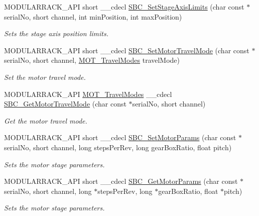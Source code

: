 \begin{DoxyCompactItemize}
M\+O\+D\+U\+L\+A\+R\+R\+A\+C\+K\+\_\+\+A\+PI short \+\_\+\+\_\+cdecl \hyperlink{group___modular_stepper_ga25ab4d2f78be5021d04e5cf0fda41ac2}{S\+B\+C\+\_\+\+Set\+Stage\+Axis\+Limits} (char const $\ast$serial\+No, short channel, int min\+Position, int max\+Position)
\begin{DoxyCompactList}\small\item\em Sets the stage axis position limits. \end{DoxyCompactList}\item 
M\+O\+D\+U\+L\+A\+R\+R\+A\+C\+K\+\_\+\+A\+PI short \+\_\+\+\_\+cdecl \hyperlink{group___modular_stepper_gaa9bf98a89c2c8ec864dfb61223e00228}{S\+B\+C\+\_\+\+Set\+Motor\+Travel\+Mode} (char const $\ast$serial\+No, short channel, \hyperlink{group___common_ga6ba6123918e8f35d6fef7daf9dbd11d4}{M\+O\+T\+\_\+\+Travel\+Modes} travel\+Mode)
\begin{DoxyCompactList}\small\item\em Set the motor travel mode. \end{DoxyCompactList}\item 
M\+O\+D\+U\+L\+A\+R\+R\+A\+C\+K\+\_\+\+A\+PI \hyperlink{group___common_ga6ba6123918e8f35d6fef7daf9dbd11d4}{M\+O\+T\+\_\+\+Travel\+Modes} \+\_\+\+\_\+cdecl \hyperlink{group___modular_stepper_gaf544a9f708ec27398c729b86feccddb1}{S\+B\+C\+\_\+\+Get\+Motor\+Travel\+Mode} (char const $\ast$serial\+No, short channel)
\begin{DoxyCompactList}\small\item\em Get the motor travel mode. \end{DoxyCompactList}\item 
M\+O\+D\+U\+L\+A\+R\+R\+A\+C\+K\+\_\+\+A\+PI short \+\_\+\+\_\+cdecl \hyperlink{group___modular_stepper_gac0871a37ad06edb69d6f7ee36b27e436}{S\+B\+C\+\_\+\+Set\+Motor\+Params} (char const $\ast$serial\+No, short channel, long steps\+Per\+Rev, long gear\+Box\+Ratio, float pitch)
\begin{DoxyCompactList}\small\item\em Sets the motor stage parameters. \end{DoxyCompactList}\item 
M\+O\+D\+U\+L\+A\+R\+R\+A\+C\+K\+\_\+\+A\+PI short \+\_\+\+\_\+cdecl \hyperlink{group___modular_stepper_ga33cbba8bf253843323a726d7c2759826}{S\+B\+C\+\_\+\+Get\+Motor\+Params} (char const $\ast$serial\+No, short channel, long $\ast$steps\+Per\+Rev, long $\ast$gear\+Box\+Ratio, float $\ast$pitch)
\begin{DoxyCompactList}\small\item\em Sets the motor stage parameters. \end{DoxyCompactList}\item 

\end{DoxyCompactItemize}

